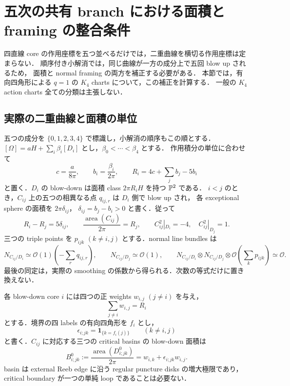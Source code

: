 \section{五次の共有 branch における面積と framing の整合条件}
\label{qg8:section}

四直線 core の作用座標を五つ並べるだけでは，二重曲線を横切る作用座標は定まらない．
順序付き小解消では，同じ曲線が一方の成分上で五回 blow up されるため，
面積と normal framing の両方を補正する必要がある．
本節では，有向四角形による $q=1$ の $K_4$ charts について，この補正を計算する．
一般の $K_4$ action charts 全ての分類は主張しない．

\subsection{実際の二重曲線と面積の単位}

五つの成分を $\{0,1,2,3,4\}$ で標識し，小解消の順序もこの順とする．
$[\Omega]=aH+\sum_i\beta_i[D_i]$ とし，$\beta_0<\cdots<\beta_4$ とする．
作用積分の単位に合わせて
\[
 c=\frac{a}{8\pi},\qquad b_i=\frac{\beta_i}{2\pi},\qquad
 R_i=4c+\sum_jb_j-5b_i
\]
と置く．$D_i$ の blow-down は面積 class $2\pi R_iH$ を持つ $\mathbb P^2$ である．
$i<j$ のとき，$C_{ij}$ 上の五つの相異なる点 $q_{ij,r}$ は $D_i$ 側で blow up され，
各 exceptional sphere の面積を $2\pi\delta_{ij}$，
$\delta_{ij}=b_j-b_i>0$ と書く．従って
\begin{equation}\label{qg8:actual-curve}
 R_i-R_j=5\delta_{ij},\qquad
 \frac{\operatorname{area}(C_{ij})}{2\pi}=R_j,
 \qquad C_{ij}^2|_{D_i}=-4,\quad C_{ij}^2|_{D_j}=1.
\end{equation}
三つの triple points を $p_{ijk}$ $(k\ne i,j)$ とする．normal line bundles は
\begin{equation}\label{qg8:normal-bundles}
 N_{C_{ij}/D_i}\simeq\mathcal O(1)(-\textstyle\sum_rq_{ij,r}),\qquad
 N_{C_{ij}/D_j}\simeq\mathcal O(1),\qquad
 N_{C_{ij}/D_i}\otimes N_{C_{ij}/D_j}
       \otimes\mathcal O(\textstyle\sum_kp_{ijk})\simeq\mathcal O.
\end{equation}
最後の同定は，実際の smoothing の係数から得られる．次数の等式だけに置き換えない．

各 blow-down core $i$ には四つの正 weights $w_{i,j}$ $(j\ne i)$ を与え，
\begin{equation}\label{qg8:row-sum}
 \sum_{j\ne i}w_{i,j}=R_i
\end{equation}
とする．境界の四 labels の有向四角形を $f_i$ とし，
\[
 \epsilon_{i;jk}=\mathbf1_{\{k=f_i(j)\}}\qquad(k\ne i,j)
\]
と書く．$C_{ij}$ に対応する三つの critical basins の blow-down 面積は
\begin{equation}\label{qg8:blowdown-basin}
 B^0_{i;jk}:=\frac{\operatorname{area}(D^0_{i;jk})}{2\pi}
 =w_{i,k}+\epsilon_{i;jk}w_{i,j}.
\end{equation}
basin は external Reeb edge に沿う regular puncture disks の増大極限であり，
critical boundary が一つの単純 loop であることは必要ない．

